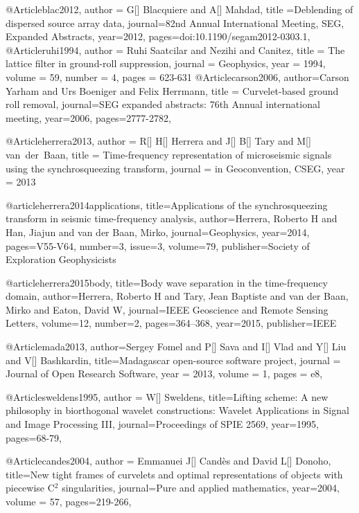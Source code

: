 @Article{blac2012,
  author = {G[] Blacquiere and A[] Mahdad},
  title ={Deblending of dispersed source array data},
  journal={82nd Annual International Meeting, SEG, Expanded Abstracts},
  year=2012,
  pages={doi:10.1190/segam2012-0303.1},
}
@Article{ruhi1994,
  author = 	 {Ruhi Saatcilar and Nezihi and Canitez},
  title = 	 {The lattice filter in ground-roll suppression},
  journal = 	 {Geophysics},
  year = 	 1994,
  volume = 	 59,
  number = 	 4,
  pages = 	 {623-631}}
@Article{carson2006,
  author={Carson Yarham and Urs Boeniger and Felix Herrmann},
  title = {Curvelet-based ground roll removal},
  journal={SEG expanded abstracts: 76th Annual international meeting},
  year=2006,
  pages={2777-2782},
}

@Article{herrera2013,
  author = 	 {R[] H[] Herrera and J[] B[] Tary and M[] van~der~Baan},
  title = 	 {Time-frequency representation of microseismic signals using the synchrosqueezing transform},
  journal = 	 {in Geoconvention, CSEG},
  year = 	 2013
}

@article{herrera2014applications,
  title={Applications of the synchrosqueezing transform in seismic time-frequency analysis},
  author={Herrera, Roberto H and Han, Jiajun and van der Baan, Mirko},
  journal={Geophysics},
  year={2014},
  pages={V55-V64},
  number=3,
  issue=3,
  volume=79,
  publisher={Society of Exploration Geophysicists}
}

@article{herrera2015body,
  title={Body wave separation in the time-frequency domain},
  author={Herrera, Roberto H and Tary, Jean Baptiste and van der Baan, Mirko and Eaton, David W},
  journal={IEEE Geoscience and Remote Sensing Letters},
  volume={12},
  number={2},
  pages={364--368},
  year={2015},
  publisher={IEEE}
}

@Article{mada2013,
  author={Sergey Fomel and P[] Sava and I[] Vlad and Y[] Liu and V[] Bashkardin},
  title={Madagascar open-source software project},
  journal = 	 {Journal of Open Research Software},
  year = 	 2013,
  volume =	 1,
  pages =	 {e8},
}

@Article{sweldens1995,
  author = {W[] Sweldens},
  title={Lifting scheme: A new philosophy in biorthogonal wavelet constructions: Wavelet Applications in Signal and Image Processing III},
  journal={Proceedings of SPIE 2569},
  year=1995,
  pages={68-79},
}

@Article{candes2004,
  author = {Emmanuei J[] Cand\`{e}s and David L[] Donoho},
  title={New tight frames of curvelets and optimal representations of objects with piecewise {C}$^2$ singularities},
  journal={Pure and applied mathematics},
  year=2004,
  volume =	 57,
  pages={219-266},
}


